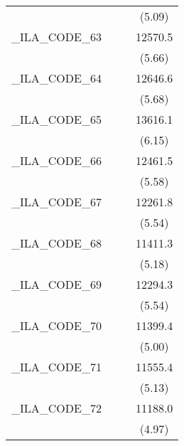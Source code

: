 {\begin{tabular}{l*{3}{c}}
            &                     &                     &      (5.09)         \\
[1em]
\_ILA\_CODE\_63&                     &                     &     12570.5\sym{***}\\
            &                     &                     &      (5.66)         \\
[1em]
\_ILA\_CODE\_64&                     &                     &     12646.6\sym{***}\\
            &                     &                     &      (5.68)         \\
[1em]
\_ILA\_CODE\_65&                     &                     &     13616.1\sym{***}\\
            &                     &                     &      (6.15)         \\
[1em]
\_ILA\_CODE\_66&                     &                     &     12461.5\sym{***}\\
            &                     &                     &      (5.58)         \\
[1em]
\_ILA\_CODE\_67&                     &                     &     12261.8\sym{***}\\
            &                     &                     &      (5.54)         \\
[1em]
\_ILA\_CODE\_68&                     &                     &     11411.3\sym{***}\\
            &                     &                     &      (5.18)         \\
[1em]
\_ILA\_CODE\_69&                     &                     &     12294.3\sym{***}\\
            &                     &                     &      (5.54)         \\
[1em]
\_ILA\_CODE\_70&                     &                     &     11399.4\sym{***}\\
            &                     &                     &      (5.00)         \\
[1em]
\_ILA\_CODE\_71&                     &                     &     11555.4\sym{***}\\
            &                     &                     &      (5.13)         \\
[1em]
\_ILA\_CODE\_72&                     &                     &     11188.0\sym{***}\\
            &                     &                     &      (4.97)         \\

\end{tabular}}
